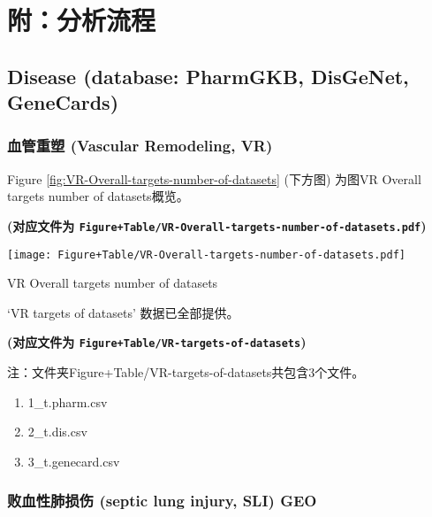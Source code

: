 \documentclass[
]{article}
\providecommand{\tightlist}{%
  \setlength{\itemsep}{0pt}\setlength{\parskip}{0pt}}
\begin{document}
\hypertarget{workflow}{%
\section{附：分析流程}\label{workflow}}

\hypertarget{disease-database-pharmgkb-disgenet-genecards}{%
\subsection{Disease (database: PharmGKB, DisGeNet, GeneCards)}\label{disease-database-pharmgkb-disgenet-genecards}}

\hypertarget{vr}{%
\subsubsection{血管重塑 (Vascular Remodeling, VR)}\label{vr}}

Figure \ref{fig:VR-Overall-targets-number-of-datasets} (下方图) 为图VR Overall targets number of datasets概览。

\textbf{(对应文件为 \texttt{Figure+Table/VR-Overall-targets-number-of-datasets.pdf})}

\def\@captype{figure}
\begin{center}
\texttt{[image: Figure+Table/VR-Overall-targets-number-of-datasets.pdf]}
\caption{VR Overall targets number of datasets}\label{fig:VR-Overall-targets-number-of-datasets}
\end{center}

`VR targets of datasets' 数据已全部提供。

\textbf{(对应文件为 \texttt{Figure+Table/VR-targets-of-datasets})}

\begin{center}\begin{tcolorbox}[colback=gray!10, colframe=gray!50, width=0.9\linewidth, arc=1mm, boxrule=0.5pt]注：文件夹Figure+Table/VR-targets-of-datasets共包含3个文件。

\begin{enumerate}\tightlist
\item 1\_t.pharm.csv
\item 2\_t.dis.csv
\item 3\_t.genecard.csv
\end{enumerate}\end{tcolorbox}
\end{center}

\hypertarget{sli}{%
\subsubsection{败血性肺损伤 (septic lung injury, SLI) GEO}\label{sli}}
\end{document}
